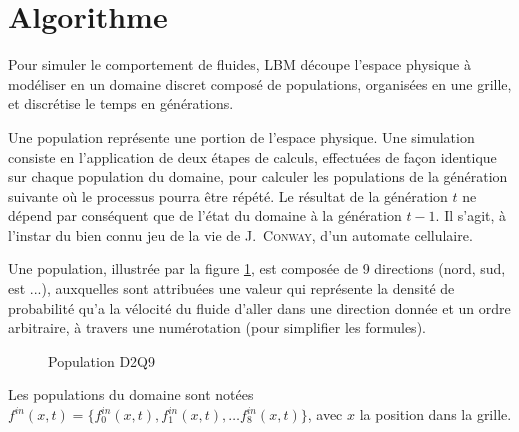 
\section{Algorithme} \label{title-lbm_algo}
Pour simuler le comportement de fluides, \acs{LBM} découpe l'espace physique à modéliser en un domaine discret composé de populations, organisées en une grille, et discrétise le temps en générations. 

Une population représente une portion de l'espace physique. Une simulation consiste en l'application de deux étapes de calculs, effectuées de façon identique sur chaque population du domaine, pour calculer les populations de la génération suivante où le processus pourra être répété. Le résultat de la génération $t$ ne dépend par conséquent que de l'état du domaine à la génération $t-1$.  Il s'agit, à l'instar du bien connu jeu de la vie de \textsc{J.~Conway}, d'un automate cellulaire.


Une population, illustrée par la figure \ref{fig:population_d2q9}, est composée de 9 directions (nord, sud, est ...), auxquelles sont attribuées une valeur qui représente la densité de probabilité qu'a la vélocité du fluide d'aller dans une direction donnée et un ordre arbitraire, à travers une numérotation (pour simplifier les formules).

\begin{figure}[h]
	\centering
	\caption{Population D2Q9}
	\label{fig:population_d2q9}
\end{figure}
Les populations du domaine sont notées $f^{in}(x,t) = \{f^{in}_0(x,t), f^{in}_1(x,t), \dots f^{in}_8(x,t)\}$, avec $x$ la position dans la grille.

